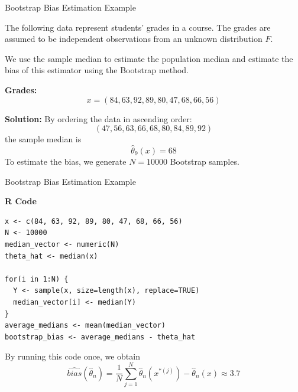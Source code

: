 \documentclass[8pt]{beamer}
\begin{document}
\begin{frame}{Bootstrap Bias Estimation Example}

The following data represent students' grades in a course. The grades are assumed to be independent observations from an unknown distribution $F$. 

We use the sample median to estimate the population median and estimate the bias of this estimator using the Bootstrap method.

\vspace{3mm}

\textbf{Grades:}
\[
x = (84, 63, 92, 89, 80, 47, 68, 66, 56)
\]

\vspace{3mm}

\textbf{Solution:}
By ordering the data in ascending order:
\[
(47, 56, 63, 66, 68, 80, 84, 89, 92)
\]
the sample median is
\[
\widehat{\theta}_9(x) = 68
\]
To estimate the bias, we generate $N = 10000$ Bootstrap samples.

\end{frame}
\begin{frame}[fragile]{Bootstrap Bias Estimation Example}

\textbf{R Code}

\begin{lstlisting}
x <- c(84, 63, 92, 89, 80, 47, 68, 66, 56)
N <- 10000
median_vector <- numeric(N)
theta_hat <- median(x)

for(i in 1:N) {
  Y <- sample(x, size=length(x), replace=TRUE) 
  median_vector[i] <- median(Y)
}
average_medians <- mean(median_vector)
bootstrap_bias <- average_medians - theta_hat
\end{lstlisting}

By running this code once, we obtain
\[
\widehat{bias}(\widehat{\theta}_n) = \frac{1}{N} \sum_{j=1}^N \widehat{\theta}_n(x^{*(j)}) - \widehat{\theta}_n(x) \approx 3.7
\]
\end{frame}
\end{document}
